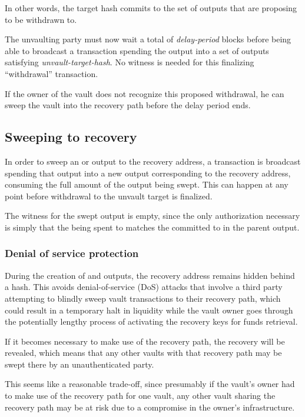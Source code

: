 \documentclass[10pt]{article}
\begin{document}
In other words, the target hash commits to the set of outputs that are proposing to be
withdrawn to. 

The unvaulting party must now wait a total of \emph{delay-period} blocks before being
able to broadcast a transaction spending the \opuv{} output into a set of outputs
satisfying \emph{unvault-target-hash}. No witness is needed for this finalizing
``withdrawal'' transaction.

If the owner of the vault does not recognize this proposed
withdrawal, he can sweep the vault into the recovery path before the delay period ends.


\subsection*{Sweeping to recovery}

In order to sweep an \opv{} or \opuv{} output to the recovery address, a transaction is
broadcast spending that output into a new output corresponding to the recovery address,
consuming the full amount of the output being swept. This can happen at any point
before withdrawal to the unvault target is finalized. 

The witness for the swept output is empty, since the only authorization necessary 
is simply that the \spk{} being spent to matches the  committed
to in the parent \opv{} output.

\subsubsection*{Denial of service protection}

During the creation of \opv{} and \opuv{} outputs, the recovery address remains hidden
behind a hash. This avoids denial-of-service (DoS) attacks that involve a third party
attempting to blindly sweep vault transactions to their recovery path, which could
result in a temporary halt in liquidity while the vault owner goes through the
potentially lengthy process of activating the recovery keys for funds retrieval.

If it becomes necessary to make use of the recovery path, the recovery \spk{} will be
revealed, which means that any other vaults with that recovery path may be swept there
by an unauthenticated party. 

This seems like a reasonable trade-off, since presumably if the vault's owner
had to make use of the recovery path for one vault, any other vault sharing the
recovery path may be at risk due to a compromise in the owner's infrastructure.
\end{document}
